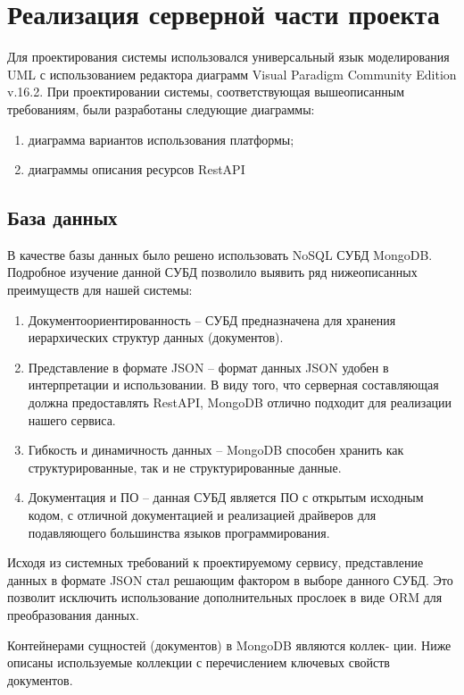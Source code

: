 \section{Реализация серверной части проекта}
Для проектирования системы использовался универсальный язык моделирования UML с использованием редактора диаграмм Visual Paradigm Community Edition v.16.2\cite{3}. При проектировании системы, соответствующая вышеописанным требованиям, были разработаны следующие диаграммы:

\begin{enumerate}
	\item диаграмма вариантов использования платформы;
	\item диаграммы описания ресурсов RestAPI 
\end{enumerate}

\subsection{База данных}
В качестве базы данных было решено использовать NoSQL СУБД MongoDB\cite{4}. Подробное изучение данной СУБД позволило выявить ряд нижеописанных преимуществ для нашей системы:
\begin{enumerate}
	\item Документоориентированность – СУБД предназначена для хранения иерархических структур данных (документов).
	\item Представление в формате JSON – формат данных JSON удобен в интерпретации и использовании. В виду того, что серверная составляющая должна предоставлять RestAPI, MongoDB отлично подходит для реализации нашего сервиса.
	\item Гибкость и динамичность данных – MongoDB способен хранить
	как структурированные, так и не структурированные данные.
	\item Документация и ПО – данная СУБД является ПО с открытым исходным кодом, с отличной документацией и реализацией драйверов для подавляющего большинства языков программирования.
\end{enumerate}

Исходя из системных требований к проектируемому сервису, представление данных в формате JSON стал решающим фактором в выборе данного СУБД. Это позволит исключить использование дополнительных прослоек в виде ORM для преобразования данных.

Контейнерами сущностей (документов) в MongoDB являются коллек-
ции. Ниже описаны используемые коллекции с перечислением ключевых свойств документов.

